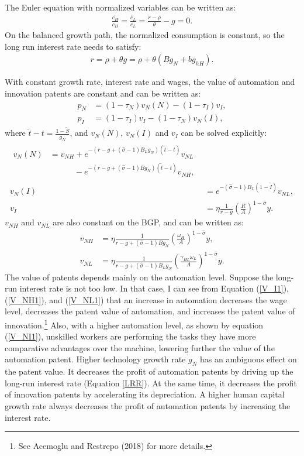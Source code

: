 \documentclass[12pt]{article}
\begin{document}
The Euler equation with normalized variables can be written as: 
\begin{align*}
\frac{\dot{c_H}}{c_H} = \frac{\dot{c_L}}{c_L} = \frac{r-\rho}{\theta}-g = 0.
\end{align*}
On the balanced growth path, the normalized consumption is constant, so the long run interest rate needs to satisfy: 
\begin{align}
\label{LRR}
r = \rho+\theta g = \rho+\theta(Bg_N+bg_{hH}).
\end{align}

With constant growth rate, interest rate and wages, the value of automation and innovation patents are constant and can be written as: 
\begin{align}
p_N &= (1-\tau_N)v_N(N)-(1-\tau_I)v_I,\\
p_I &= (1-\tau_I)v_I-(1-\tau_N)v_N(I), 
\end{align}
where $\tilde{t}-t =\frac{1-\tilde{S}}{g_N}$, and $v_N(N)$, $v_N(I)$ and $v_I$ can be solved explicitly: 
\begin{align}
\label{V_NN1}
\begin{split}
v_N(N) &= v_{NH}+e^{-(r-g+(\hat{\sigma}-1)B_Lg_N)(\tilde{t}-t)}v_{NL} \\
&\quad \quad \quad -e^{-(r-g+(\hat{\sigma}-1)Bg_N)(\tilde{t}-t)}v_{NH},
\end{split} \\
\label{V_NI1} 
v_N(I) &=e^{-(\hat{\sigma}-1)B_L(1-\tilde{I})}v_{NL}, \\
\label{V_I1}
v_I &= \eta\frac{1}{r-g}(\frac{R}{A})^{1-\hat{\sigma}}y.
\end{align}
$v_{NH}$ and $v_{NL}$ are also constant on the BGP, and can be written as: 
\begin{align}
\label{V_NH1} 
v_{NH} &= \eta\frac{1}{r-g+(\hat{\sigma}-1)Bg_N}(\frac{\omega_H}{A})^{1-\hat{\sigma}}y, \\
\label{V_NL1} 
v_{NL} &=\eta \frac{1}{r-g+(\hat{\sigma}-1)B_Lg_N}(\frac{\gamma_{HL}\omega_L}{A})^{1-\hat{\sigma}}y.
\end{align}
The value of patents depends mainly on the automation level. Suppose the long-run interest rate is not too low. In that case, I can see from Equation (\ref{V_I1}), (\ref{V_NH1}), and (\ref{V_NL1}) that an increase in automation decreases the wage level, decreases the patent value of automation, and increases the patent value of innovation.\footnote{See Acemoglu and Restrepo (2018)\nocite{AcemogluRestrepo2018} for more details.} Also, with a higher automation level, as shown by equation (\ref{V_NI1}), unskilled workers are performing the tasks they have more comparative advantages over the machine, lowering further the value of the automation patent. Higher technology growth rate $g_N$ has an ambiguous effect on the patent value. It decreases the profit of automation patents by driving up the long-run interest rate (Equation \ref{LRR}). At the same time, it decreases the profit of innovation patents by accelerating its depreciation. A higher human capital growth rate always decreases the profit of automation patents by increasing the interest rate. 
\end{document}
